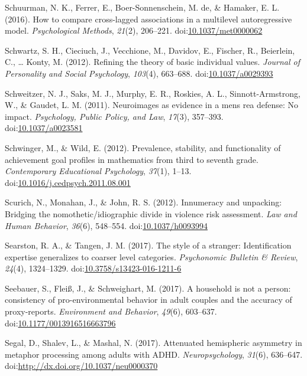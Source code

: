 \documentclass[english,man]{apa6}
\theoremstyle{definition}
\theoremstyle{definition}
\theoremstyle{definition}
\theoremstyle{remark}
\begin{document}
\hypertarget{ref-Schuurman2016}{}
Schuurman, N. K., Ferrer, E., Boer-Sonnenschein, M. de, \& Hamaker, E.
L. (2016). How to compare cross-lagged associations in a multilevel
autoregressive model. \emph{Psychological Methods}, \emph{21}(2),
206--221.
doi:\href{https://doi.org/10.1037/met0000062}{10.1037/met0000062}

\hypertarget{ref-Schwartz}{}
Schwartz, S. H., Cieciuch, J., Vecchione, M., Davidov, E., Fischer, R.,
Beierlein, C., \ldots{} Konty, M. (2012). Refining the theory of basic
individual values. \emph{Journal of Personality and Social Psychology},
\emph{103}(4), 663--688.
doi:\href{https://doi.org/10.1037/a0029393}{10.1037/a0029393}

\hypertarget{ref-Schweitzer2011}{}
Schweitzer, N. J., Saks, M. J., Murphy, E. R., Roskies, A. L.,
Sinnott-Armstrong, W., \& Gaudet, L. M. (2011). Neuroimages as evidence
in a mens rea defense: No impact. \emph{Psychology, Public Policy, and
Law}, \emph{17}(3), 357--393.
doi:\href{https://doi.org/10.1037/a0023581}{10.1037/a0023581}

\hypertarget{ref-Schwinger2012}{}
Schwinger, M., \& Wild, E. (2012). Prevalence, stability, and
functionality of achievement goal profiles in mathematics from third to
seventh grade. \emph{Contemporary Educational Psychology}, \emph{37}(1),
1--13.
doi:\href{https://doi.org/10.1016/j.cedpsych.2011.08.001}{10.1016/j.cedpsych.2011.08.001}

\hypertarget{ref-Scurich2012}{}
Scurich, N., Monahan, J., \& John, R. S. (2012). Innumeracy and
unpacking: Bridging the nomothetic/idiographic divide in violence risk
assessment. \emph{Law and Human Behavior}, \emph{36}(6), 548--554.
doi:\href{https://doi.org/10.1037/h0093994}{10.1037/h0093994}

\hypertarget{ref-Searston2016}{}
Searston, R. A., \& Tangen, J. M. (2017). The style of a stranger:
Identification expertise generalizes to coarser level categories.
\emph{Psychonomic Bulletin \& Review}, \emph{24}(4), 1324--1329.
doi:\href{https://doi.org/10.3758/s13423-016-1211-6}{10.3758/s13423-016-1211-6}

\hypertarget{ref-Seebauer2017}{}
Seebauer, S., Fleiß, J., \& Schweighart, M. (2017). A household is not a
person: consistency of pro-environmental behavior in adult couples and
the accuracy of proxy-reports. \emph{Environment and Behavior},
\emph{49}(6), 603--637.
doi:\href{https://doi.org/10.1177/0013916516663796}{10.1177/0013916516663796}

\hypertarget{ref-Segal2017}{}
Segal, D., Shalev, L., \& Mashal, N. (2017). Attenuated hemispheric
asymmetry in metaphor processing among adults with ADHD.
\emph{Neuropsychology}, \emph{31}(6), 636--647.
doi:\href{https://doi.org/http://dx.doi.org/10.1037/neu0000370}{http://dx.doi.org/10.1037/neu0000370}
\end{document}
